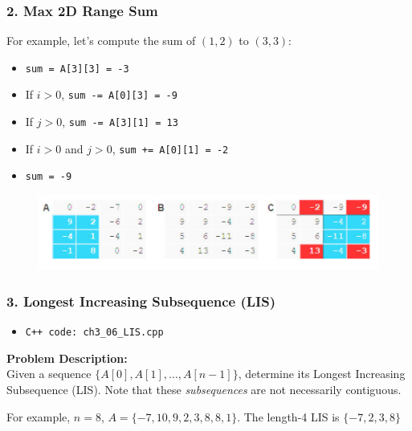 \documentclass{beamer}
\begin{document}
\begin{frame}[fragile]
\frametitle{2. Max 2D Range Sum}

For example, let’s compute the sum of $(1, 2)$ to $(3, 3)$:

\begin{itemize}
	\item \verb|sum = A[3][3] = -3|
    \item If $i>0$, \verb|sum -= A[0][3] = -9|
    \item If $j > 0$, \verb|sum -= A[3][1] = 13|
    \item If $i>0$ and $j>0$, \verb|sum += A[0][1] = -2|
    \item \color{blue}\verb|sum = -9|\color{black}
\end{itemize}

\begin{figure}
    \centering
    \includegraphics[scale=0.5]{imgs/max2d_3.png}
\end{figure}

\end{frame}


\begin{frame}[fragile]
\frametitle{3. Longest Increasing Subsequence (LIS)}

\begin{itemize}
    \item \color{red}\verb|C++ code: ch3_06_LIS.cpp|\color{black}
\end{itemize} 

\vspace{0.3cm}

\color{red}\textbf{Problem Description: }\color{black} \\ 

Given a sequence $\{A[0], A[1],\ldots, A[n-1]\}$, determine its Longest Increasing Subsequence (LIS). Note that these \textit{subsequences} are not necessarily contiguous. 

\vspace{0.3cm}

For example, $n=8$, $A = \{-7,10,9,2,3,8,8,1\}$. The length-4 LIS is $\{-7, 2, 3, 8\}$

\end{frame}
\end{document}
